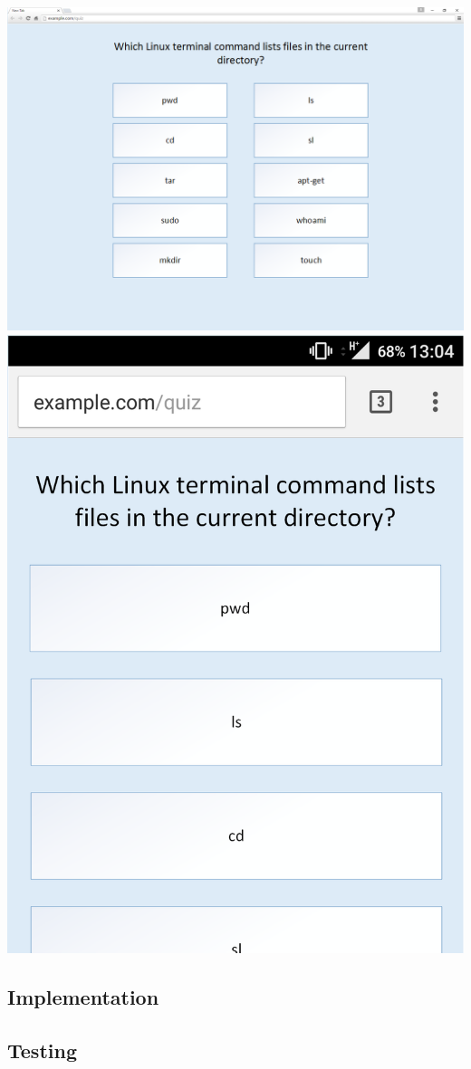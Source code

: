 \documentclass{article}
\begin{document}
\begin{center}
	\includegraphics[width=\textwidth]{Quiz-Web-Design-Cropped}\\
	\vspace{1cm}
	\includegraphics[scale=0.25]{Quiz-Mobile-Cropped}
\end{center}


\subsection{Implementation}
\subsection{Testing}
\newpage

%
%
\end{document}
